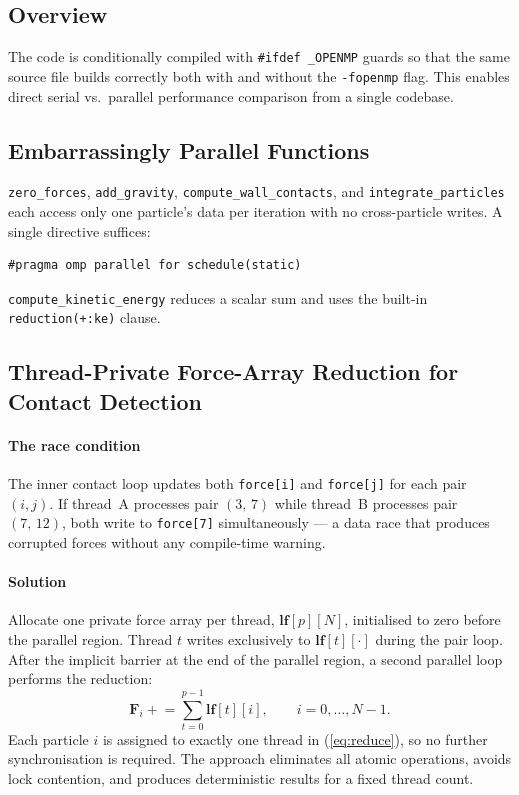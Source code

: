 \documentclass[journal]{IEEEtran}
\begin{document}
\subsection{Overview}
The code is conditionally compiled with \texttt{\#ifdef \_OPENMP}
guards so that the same source file builds correctly both with and
without the \texttt{-fopenmp} flag.  This enables direct serial vs.\
parallel performance comparison from a single codebase.

\subsection{Embarrassingly Parallel Functions}
\texttt{zero\_forces}, \texttt{add\_gravity},
\texttt{compute\_wall\_contacts}, and \texttt{integrate\_particles}
each access only one particle's data per iteration with no
cross-particle writes.  A single directive suffices:
\begin{verbatim}
#pragma omp parallel for schedule(static)
\end{verbatim}
\texttt{compute\_kinetic\_energy} reduces a scalar sum and uses the
built-in \texttt{reduction(+:ke)} clause.

\subsection{Thread-Private Force-Array Reduction for Contact Detection}
\label{sec:reduction}

\paragraph{The race condition}
The inner contact loop updates both \texttt{force[i]} and
\texttt{force[j]} for each pair $(i,j)$.  If thread~A processes pair
$(3,\,7)$ while thread~B processes pair $(7,\,12)$, both write to
\texttt{force[7]} simultaneously --- a data race that produces
corrupted forces without any compile-time warning.

\paragraph{Solution}
Allocate one private force array per thread, $\mathbf{lf}[p][N]$,
initialised to zero before the parallel region.  Thread $t$ writes
exclusively to $\mathbf{lf}[t][\cdot]$ during the pair loop.  After
the implicit barrier at the end of the parallel region, a second
parallel loop performs the reduction:
\begin{equation}
  \mathbf{F}_i \mathrel{+}= \sum_{t=0}^{p-1}\mathbf{lf}[t][i],
  \qquad i = 0,\ldots,N{-}1.
  \label{eq:reduce}
\end{equation}
Each particle $i$ is assigned to exactly one thread in (\ref{eq:reduce}),
so no further synchronisation is required.  The approach eliminates
all atomic operations, avoids lock contention, and produces
deterministic results for a fixed thread count.
\end{document}
